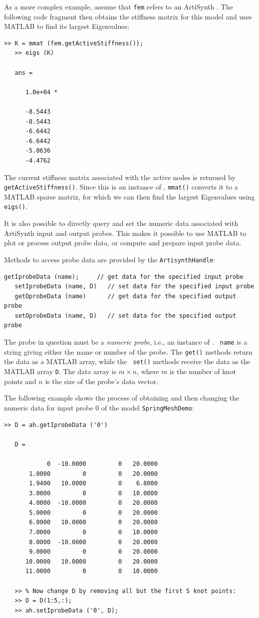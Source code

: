 \documentclass{article}
\begin{document}
As a more complex example, assume that {\tt fem} refers to an
ArtiSynth . The
following code fragment then obtains the stiffness matrix for this
model and uses MATLAB to find its largest Eigenvalues:
%
\begin{lstlisting}[]
   >> K = mmat (fem.getActiveStiffness());
   >> eigs (K)
   
   ans =
   
      1.0e+04 *
   
      -8.5443
      -8.5443
      -6.6442
      -6.6442
      -5.0636
      -4.4762
\end{lstlisting}
%
The current stiffness matrix associated with the active nodes is
returned by {\tt getActiveStiffness()}. Since this is an instance of
, {\tt mmat()} converts
it to a MATLAB sparse matrix, for which we can then find the largest
Eigenvalues using {\tt eigs()}.

It is also possible to directly query and set the numeric data
associated with ArtiSynth input and output probes. This makes it
possible to use MATLAB to plot or process output probe data, or
compute and prepare input probe data.

Methods to access probe data are provided by the {\tt ArtisynthHandle}:
%
\begin{lstlisting}[]
   getIprobeData (name);     // get data for the specified input probe
   setIprobeData (name, D)   // set data for the specified input probe
   getOprobeData (name)      // get data for the specified output probe
   setOprobeData (name, D)   // set data for the specified output probe
\end{lstlisting}
%
The probe in question must be a {\it numeric probe}, i.e., an instance of 
. {\tt
name} is a string giving either the name or number of the probe. The
{\tt get()} methods return the data as a MATLAB array, while the {\tt
set()} methods receive the data as the MATLAB array {\tt D}.  The
data array is $m \times n$, where $m$ is the number of knot points
and $n$ is the size of the probe's data vector.

The following example shows the process of obtaining and then changing
the numeric data for input probe 0 of the model {\tt SpringMeshDemo}:
%
\begin{lstlisting}[]
   >> D = ah.getIprobeData ('0')
   
   D =
   
            0  -10.0000         0   20.0000
       1.0000         0         0   20.0000
       1.9400   10.0000         0    6.8000
       3.0000         0         0   10.0000
       4.0000  -10.0000         0   20.0000
       5.0000         0         0   20.0000
       6.0000   10.0000         0   20.0000
       7.0000         0         0   10.0000
       8.0000  -10.0000         0   20.0000
       9.0000         0         0   20.0000
      10.0000   10.0000         0   20.0000
      11.0000         0         0   10.0000
   
   >> % Now change D by removing all but the first 5 knot points:
   >> D = D(1:5,:);
   >> ah.setIprobeData ('0', D);
\end{lstlisting}
%
\end{document}
